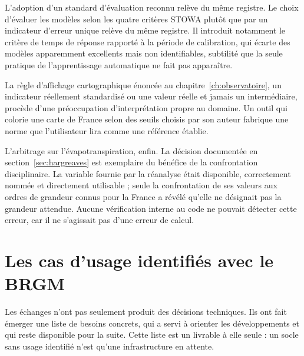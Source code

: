 L'adoption d'un standard d'évaluation reconnu relève du même registre. Le choix d'évaluer les
modèles selon les quatre critères STOWA plutôt que par un indicateur d'erreur unique relève du même registre.
Il introduit notamment le critère de temps de réponse rapporté à la période de calibration, qui
écarte des modèles apparemment excellents mais non identifiables, subtilité que la seule
pratique de l'apprentissage automatique ne fait pas apparaître.

La règle d'affichage cartographique énoncée au chapitre~\ref{ch:observatoire}, un indicateur réellement standardisé ou une valeur réelle et
jamais un intermédiaire, procède d'une préoccupation d'interprétation propre au domaine. Un
outil qui colorie une carte de France selon des seuils choisis par son auteur fabrique une norme
que l'utilisateur lira comme une référence établie.

L'arbitrage sur l'évapotranspiration, enfin. La décision documentée en
section~\ref{sec:hargreaves} est exemplaire du bénéfice de la confrontation disciplinaire. La
variable fournie par la réanalyse était disponible, correctement nommée et directement
utilisable ; seule la confrontation de ses valeurs aux ordres de grandeur connus pour la France a
révélé qu'elle ne désignait pas la grandeur attendue. Aucune vérification interne au code ne
pouvait détecter cette erreur, car il ne s'agissait pas d'une erreur de calcul.

\section{Les cas d'usage identifiés avec le BRGM}

Les échanges n'ont pas seulement produit des décisions techniques. Ils ont fait émerger une
liste de besoins concrets, qui a servi à orienter les développements et qui reste disponible
pour la suite. Cette liste est un livrable à elle seule : un socle sans usage identifié n'est qu'une
infrastructure en attente.

